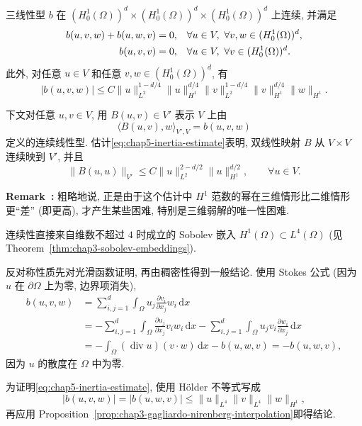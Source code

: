 \begin{Lemma}
\label{lem:chap5-inertia-trilinear-form}
三线性型 $b$ 在 $(H_0^1(\Omega))^d\times(H_0^1(\Omega))^d\times(H_0^1(\Omega))^d$ 上连续, 并满足
\begin{align}
 b(u,v,w)+b(u,w,v)&=0,
 &&\forall u\in V,\ \forall v,w\in(H_0^1(\Omega))^d,\notag\\
 b(u,v,v)&=0,
 &&\forall u\in V,\ \forall v\in(H_0^1(\Omega))^d.
\label{eq:chap5-inertia-antisymmetry}
\end{align}
此外, 对任意 $u\in V$ 和任意 $v,w\in(H_0^1(\Omega))^d$, 有
\begin{equation}
 |b(u,v,w)|\leq C
 \|u\|_{L^2}^{1-d/4}\|u\|_{H^1}^{d/4}
 \|v\|_{L^2}^{1-d/4}\|v\|_{H^1}^{d/4}
 \|w\|_{H^1}.
\label{eq:chap5-inertia-estimate}
\end{equation}
\end{Lemma}

下文对任意 $u,v\in V$, 用 $B(u,v)\in V'$ 表示 $V$ 上由
\begin{equation}
 \langle B(u,v),w\rangle_{V',V}=b(u,v,w)
\label{eq:chap5-inertia-operator}
\end{equation}
定义的连续线性型. 估计\eqref{eq:chap5-inertia-estimate}表明, 双线性映射 $B$ 从 $V\times V$ 连续映到 $V'$, 并且
\begin{equation}
 \|B(u,u)\|_{V'}\leq C\|u\|_{L^2}^{2-d/2}\|u\|_{H^1}^{d/2},
 \qquad\forall u\in V.
\label{eq:chap5-inertia-operator-estimate}
\end{equation}

\par\noindent{}\textbf{Remark~\thechapterfivesectiononeremark:}\label{rem:chap5-inertia-dimension}
粗略地说, 正是由于这个估计中 $H^1$ 范数的幂在三维情形比二维情形更``差'' (即更高), 才产生某些困难, 特别是三维弱解的唯一性困难.

\begin{Proof}
连续性直接来自维数不超过 $4$ 时成立的 Sobolev 嵌入 $H^1(\Omega)\subset L^4(\Omega)$ (见 Theorem~\ref{thm:chap3-sobolev-embeddings}).

反对称性质先对光滑函数证明, 再由稠密性得到一般结论. 使用 Stokes 公式 (因为 $u$ 在 $\partial\Omega$ 上为零, 边界项消失),
\begin{align*}
 b(u,v,w)
 &=\sum_{i,j=1}^d\int_\Omega u_j\frac{\partial v_i}{\partial x_j}w_i\,\mathrm dx\\
 &=-\sum_{i,j=1}^d\int_\Omega\frac{\partial u_j}{\partial x_j}v_iw_i\,\mathrm dx
   -\sum_{i,j=1}^d\int_\Omega u_jv_i\frac{\partial w_i}{\partial x_j}\,\mathrm dx\\
 &=-\int_\Omega(\operatorname{div}u)(v\cdot w)\,\mathrm dx-b(u,w,v)
 =-b(u,w,v),
\end{align*}
因为 $u$ 的散度在 $\Omega$ 中为零.

为证明\eqref{eq:chap5-inertia-estimate}, 使用 Hölder 不等式写成
\[
 |b(u,v,w)|=|b(u,w,v)|\leq\|u\|_{L^4}\|v\|_{L^4}\|w\|_{H^1},
\]
再应用 Proposition~\ref{prop:chap3-gagliardo-nirenberg-interpolation}即得结论.
\end{Proof}

